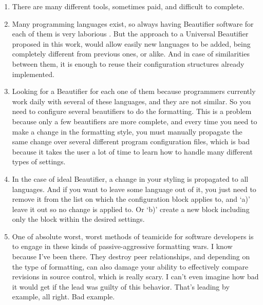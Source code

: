 \begin{englishtext}
    \begin{enumerate}[leftmargin=*]

        \item There are many different tools, sometimes paid, and difficult to
        complete. \cite{universalCodeFormatter}

        \item Many programming languages exist, so always having Beautifier
        software for each of them is very laborious
        \cite{universalCodeFormatter}. But the approach to a Universal
        Beautifier proposed in this work, would allow easily new languages to be
        added, being completely different from previous ones, or alike. And in
        case of similarities between them, it is enough to reuse their
        configuration structures already implemented.

        \item Looking for a Beautifier for each one of them because programmers
        currently work daily with several of these languages, and they are not
        similar. So you need to configure several beautifiers to do the
        formatting. This is a problem because only a few beautifiers are more
        complete, and every time you need to make a change in the formatting
        style, you must manually propagate the same change over several
        different program configuration files, which is bad because it takes the
        user a lot of time to learn how to handle many different types of
        settings. \cite{Schweitzer}

        \item In the case of ideal Beautifier, a change in your styling is
        propagated to all languages. And if you want to leave some language out
        of it, you just need to remove it from the list on which the
        configuration block applies to, and `a)' leave it out so no change is
        applied to. Or `b)' create a new block including only the block within
        the desired settings.

        \item
        \begin{citacao}
        One of absolute worst, worst methods of teamicide for software developers is to engage
        in these kinds of passive-aggressive formatting wars. I know because I've been there.
        They destroy peer relationships, and depending on the type of formatting, can also damage
        your ability to effectively compare revisions in source control, which is really scary.
        I can't even imagine how bad it would get if the lead was guilty of this behavior. That's
        leading by example, all right. Bad example. \cite{Atwood}
        \end{citacao}


\end{enumerate}
\end{englishtext}
